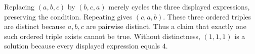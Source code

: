 Replacing $(a,b,c)$ by $(b,c,a)$ merely cycles the three displayed expressions, preserving the condition. Repeating gives $(c,a,b)$. These three ordered triples are distinct because $a,b,c$ are pairwise distinct. Thus a claim that exactly one such ordered triple exists cannot be true. Without distinctness, $\boxed{(1,1,1)}$ is a solution because every displayed expression equals $4$.
